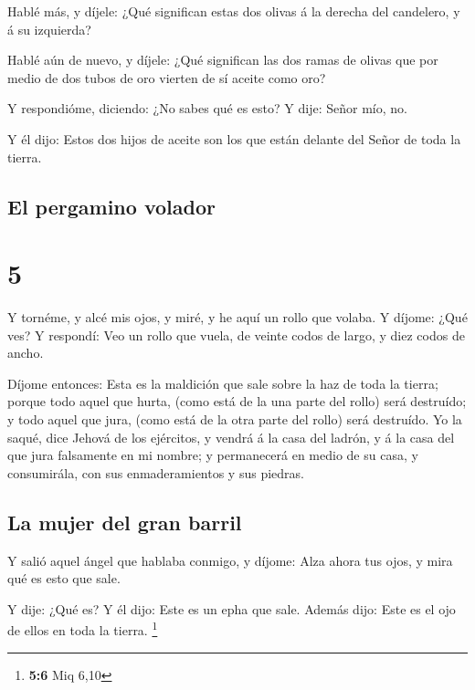  Hablé más, y díjele: ¿Qué significan estas dos olivas á la
derecha del candelero, y á su izquierda?

 Hablé aún de nuevo, y díjele: ¿Qué significan las dos
ramas de olivas que por medio de dos tubos de oro vierten de sí aceite
como oro?

 Y respondióme, diciendo: ¿No sabes qué es esto? Y dije:
Señor mío, no.

 Y él dijo: Estos dos hijos de aceite son los que están
delante del Señor de toda la tierra.

\hypertarget{el-pergamino-volador}{%
\subsection{El pergamino volador}\label{el-pergamino-volador}}

\hypertarget{section-4}{%
\section{5}\label{section-4}}

 Y tornéme, y alcé mis ojos, y miré, y he aquí un rollo que
volaba.  Y díjome: ¿Qué ves? Y respondí: Veo un rollo que
vuela, de veinte codos de largo, y diez codos de ancho.

 Díjome entonces: Esta es la maldición que sale sobre la haz
de toda la tierra; porque todo aquel que hurta, (como está de la una
parte del rollo) será destruído; y todo aquel que jura, (como está de la
otra parte del rollo) será destruído.  Yo la saqué, dice
Jehová de los ejércitos, y vendrá á la casa del ladrón, y á la casa del
que jura falsamente en mi nombre; y permanecerá en medio de su casa, y
consumirála, con sus enmaderamientos y sus piedras.

\hypertarget{la-mujer-del-gran-barril}{%
\subsection{La mujer del gran barril}\label{la-mujer-del-gran-barril}}

 Y salió aquel ángel que hablaba conmigo, y díjome: Alza
ahora tus ojos, y mira qué es esto que sale.

 Y dije: ¿Qué es? Y él dijo: Este es un epha que sale.
Además dijo: Este es el ojo de ellos en toda la tierra. \footnote{\textbf{5:6}
  Miq 6,10}

